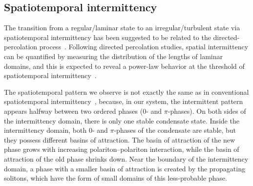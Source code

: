 %
%
\subsection{Spatiotemporal intermittency}
The transition from a regular/laminar state to an irregular/turbulent state via spatiotemporal intermittency has been suggested to be related to the directed-percolation process~\cite{Pomeau:1986aa}.
Following directed percolation studies, spatial intermittency can be quantified by measuring the distribution of the lengths of laminar domains, and this is expected to reveal a power-law behavior at the threshold of spatiotemporal intermittency~\cite{Chate:1987aa, Chate:1994aa}.

The spatiotemporal pattern we observe is not exactly the same as in conventional spatiotemporal intermittency~\cite{Pomeau:1986aa}, because, in our system, the intermittent pattern appears halfway between two ordered phases ($0$- and $\pi$-phases).
On both sides of the intermittency domain, there is only one stable condensate state.
Inside the intermittency domain, both $0$- and $\pi$-phases of the condensate are stable, but they possess different basins of attraction.
The basin of attraction of the new phase grows with increasing polariton--polariton interaction, while the basin of attraction of the old phase shrinks down.
Near the boundary of the intermittency domain, a phase with a smaller basin of attraction is created by the propagating solitons, which have the form of small domains of this less-probable phase.

